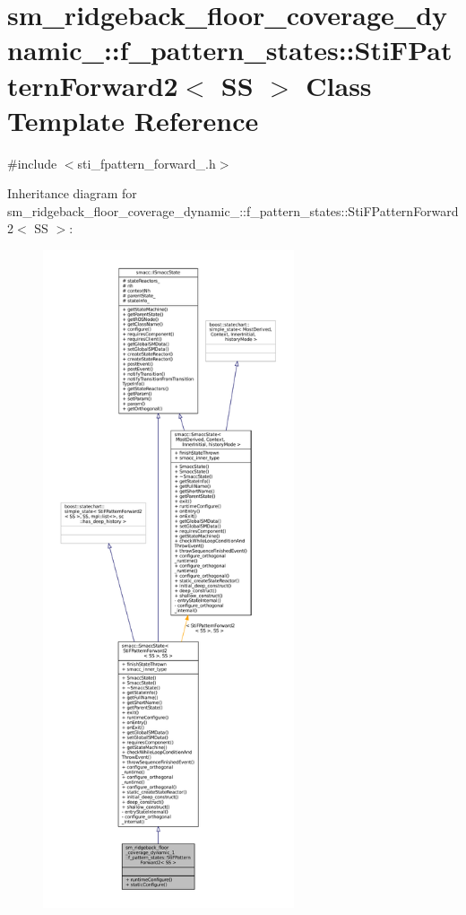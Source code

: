 \hypertarget{structsm__ridgeback__floor__coverage__dynamic__1_1_1f__pattern__states_1_1StiFPatternForward2}{}\section{sm\+\_\+ridgeback\+\_\+floor\+\_\+coverage\+\_\+dynamic\+\_\+:\+:f\+\_\+pattern\+\_\+states\+:\+:Sti\+F\+Pattern\+Forward2$<$ SS $>$ Class Template Reference}
\label{structsm__ridgeback__floor__coverage__dynamic__1_1_1f__pattern__states_1_1StiFPatternForward2}


{\ttfamily \#include $<$sti\+\_\+fpattern\+\_\+forward\+\_.\+h$>$}



Inheritance diagram for sm\+\_\+ridgeback\+\_\+floor\+\_\+coverage\+\_\+dynamic\+\_\+:\+:f\+\_\+pattern\+\_\+states\+:\+:Sti\+F\+Pattern\+Forward2$<$ SS $>$\+:
\nopagebreak
\begin{figure}[H]
\begin{center}
\leavevmode
\includegraphics[height=550pt]{structsm__ridgeback__floor__coverage__dynamic__1_1_1f__pattern__states_1_1StiFPatternForward2__inherit__graph}
\end{center}
\end{figure}


